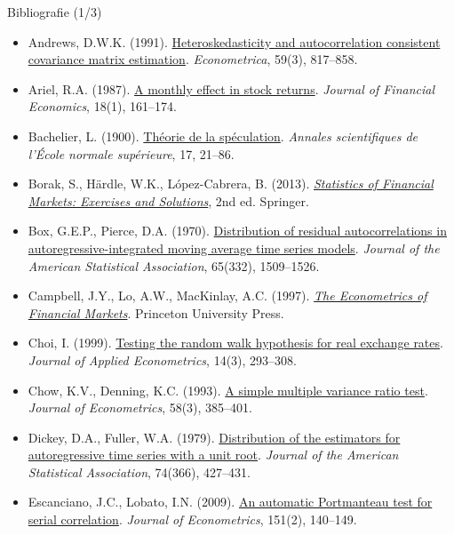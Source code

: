 \begin{frame}{Bibliografie (1/3)}
\itemsize{\tiny}
\begin{itemize}
    \item Andrews, D.W.K. (1991). \href{https://doi.org/10.2307/2938229}{Heteroskedasticity and autocorrelation consistent covariance matrix estimation}. \textit{Econometrica}, 59(3), 817--858.
    \item Ariel, R.A. (1987). \href{https://doi.org/10.1016/0304-405X(87)90066-3}{A monthly effect in stock returns}. \textit{Journal of Financial Economics}, 18(1), 161--174.
    \item Bachelier, L. (1900). \href{https://doi.org/10.24033/asens.476}{Théorie de la spéculation}. \textit{Annales scientifiques de l'École normale supérieure}, 17, 21--86.
    \item Borak, S., Härdle, W.K., López-Cabrera, B. (2013). \href{https://doi.org/10.1007/978-3-642-33929-5}{\textit{Statistics of Financial Markets: Exercises and Solutions}}, 2nd ed. Springer.
    \item Box, G.E.P., Pierce, D.A. (1970). \href{https://doi.org/10.1080/01621459.1970.10481180}{Distribution of residual autocorrelations in autoregressive-integrated moving average time series models}. \textit{Journal of the American Statistical Association}, 65(332), 1509--1526.
    \item Campbell, J.Y., Lo, A.W., MacKinlay, A.C. (1997). \href{https://doi.org/10.1515/9781400830213}{\textit{The Econometrics of Financial Markets}}. Princeton University Press.
    \item Choi, I. (1999). \href{https://doi.org/10.1002/(SICI)1099-1255(199905/06)14:3<293::AID-JAE503>3.0.CO;2-5}{Testing the random walk hypothesis for real exchange rates}. \textit{Journal of Applied Econometrics}, 14(3), 293--308.
    \item Chow, K.V., Denning, K.C. (1993). \href{https://doi.org/10.1016/0304-4076(93)90051-6}{A simple multiple variance ratio test}. \textit{Journal of Econometrics}, 58(3), 385--401.
    \item Dickey, D.A., Fuller, W.A. (1979). \href{https://doi.org/10.1080/01621459.1979.10482531}{Distribution of the estimators for autoregressive time series with a unit root}. \textit{Journal of the American Statistical Association}, 74(366), 427--431.
    \item Escanciano, J.C., Lobato, I.N. (2009). \href{https://doi.org/10.1016/j.jeconom.2009.03.001}{An automatic Portmanteau test for serial correlation}. \textit{Journal of Econometrics}, 151(2), 140--149.

\end{itemize}
\end{frame}
